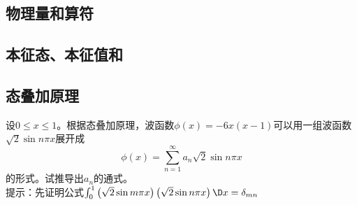 \subsection{物理量和算符}



\subsection{本征态、本征值和}



\subsection{态叠加原理}
\begin{exT}
设$0\le x \le 1$。根据态叠加原理，波函数$\phi(x) = -6x(x-1)$可以用一组波函数$\sqrt{2}\sin n\pi x$展开成
$$\phi(x) = \sum_{n=1}^{\infty} a_n \sqrt{2}\sin n\pi x$$
的形式。试推导出$a_n$的通式。\\
提示：先证明公式$\int_{0}^{1} \left( \sqrt{2}\sin m\pi x \right) \left( \sqrt{2}\sin n\pi x \right) \D x = \delta_{mn}$ 
\end{exT}

